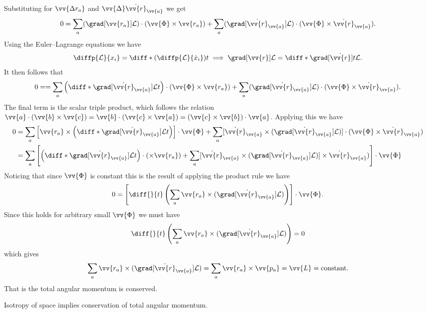 \documentclass[fleqn]{NotesClass}
\newcommand*{\lagrangian}{\mathcal{L}}
\begin{document}
    Substituting for \(\vv{\Delta r_a}\) and \(\vv{\Delta}\dot{\vv{r}}_{\vv{a}}\) we get
    \begin{equation}
        0 = \sum_a (\grad[\vv{r_a}]\lagrangian) \cdot (\vv{\Phi} \times \vv{r_a}) + \sum_a (\grad[\dot{\vv{r}}_{\vv{a}}] \lagrangian) \cdot (\vv{\Phi} \times \dot{\vv{r}}_{\vv{a}}).
    \end{equation}
    Using the Euler--Lagrange equations we have
    \begin{equation}
        \diffp{\lagrangian}{x_i} = \diff*{\left( \diffp{\lagrangian}{\dot{x}_i} \right)}{t} \implies \grad[\vv{r}] \lagrangian = \diff*{\grad[\dot{\vv{r}}]}{t} \lagrangian.
    \end{equation}
    It then follows that
    \begin{equation}
        0 =  = \sum_a \left( \diff*{\grad[\dot{\vv{r}}_{\vv{a}}] \lagrangian}{t} \right) \cdot (\vv{\Phi} \times \vv{r_a}) + \sum_a (\grad[\dot{\vv{r}}_{\vv{a}}] \lagrangian) \cdot (\vv{\Phi} \times \dot{\vv{r}}_{\vv{a}}).
    \end{equation}
    The final term is the scalar triple product, which follows the relation \(\vv{a} \cdot (\vv{b} \times \vv{c}) = \vv{b} \cdot (\vv{c} \times \vv{a}) = (\vv{c}\times\vv{b})\cdot\vv{a}\).
    Applying this we have
    \begin{align}
        0 &= \sum_a \left[ \vv{r_a} \times \left( \diff*{\grad[\dot{\vv{r}}_{\vv{a}}] \lagrangian}{t} \right) \right] \cdot\vv{\Phi} + \sum_a [\dot{\vv{r}}_{\vv{a}} \times (\grad[\dot{\vv{r}}_{\vv{a}}] \lagrangian)] \cdot (\vv{\Phi} \times \dot{\vv{r}}_{\vv{a}})\\
        &= \sum_a \left[ \left( \diff*{\grad[\dot{\vv{r}}_{\vv{a}}] \lagrangian}{t} \right) \cdot ( \times \vv{r_a}) + \sum_a [\dot{\vv{r}}_{\vv{a}} \times (\grad[\dot{\vv{r}}_{\vv{a}}] \lagrangian)] \times \dot{\vv{r}}_{\vv{a}}) \right] \cdot \vv{\Phi}
    \end{align}
    Noticing that since \(\vv{\Phi}\) is constant this is the result of applying the product rule we have
    \begin{equation}
        0 = \left[ \diff{}{t} \left( \sum_a \vv{r_a}\times (\grad[\dot{\vv{r}}_{\vv{a}}] \lagrangian) \right) \right] \cdot \vv{\Phi}.
    \end{equation}
    Since this holds for arbitrary small \(\vv{\Phi}\) we must have
    \begin{equation}
        \diff{}{t}\left( \sum_a \vv{r_a}\times (\grad[\dot{\vv{r}}_{\vv{a}}] \lagrangian) \right) = 0
    \end{equation}
    which gives
    \begin{equation}
        \sum_a \vv{r_a}\times (\grad[\dot{\vv{r}}_{\vv{a}}] \lagrangian) = \sum_{a} \vv{r_a} \times \vv{p_a} = \vv{L} = \text{constant}.
    \end{equation}
    That is the total angular momentum is conserved.
    \begin{important}
        Isotropy of space implies conservation of total angular momentum.
    \end{important}
    
\end{document}
